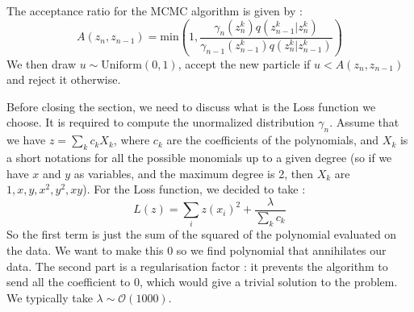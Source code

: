 \documentclass[11pt]{article}
\begin{document}
		
		The acceptance ratio for the MCMC algorithm is given by : 
		\begin{equation}
			A(z_n,z_{n-1}) = \mathrm{min} \left(1,\frac{ \gamma_n(z_n^k) q(z_{n-1}^k | z_n^k) }{ \gamma_{n-1}(z_{n-1}^k) q(z_n^k | z_{n-1}^k) }  \right)
		\end{equation}
		We then draw $u\sim \mathrm{Uniform}(0,1)$, accept the new particle if $u<A(z_n,z_{n-1})$ and reject it otherwise.
		
		Before closing the section, we need to discuss what is the Loss function we choose. It is required to compute the unormalized distribution $\gamma_n$. Assume that we have $z = \sum_k c_k X_k$, where $c_k$ are the coefficients of the polynomials, and $X_k$ is a short notations for all the possible monomials up to a given degree (so if we have $x$ and $y$ as variables, and the maximum degree is 2, then $X_k$ are $1, x, y, x^2, y^2, x y$). For the Loss function, we decided to take : 
		\begin{equation}
			L(z) = \sum_{i} z(x_i)^2 + \frac{\lambda}{\sum_k c_k}
		\end{equation}
		So the first term is just the sum of the squared of the polynomial evaluated on the data. We want to make this 0 so we find polynomial that annihilates our data. The second part is a regularisation factor : it prevents the algorithm to send all the coefficient to 0, which would give a trivial solution to the problem. We typically take $\lambda \sim \mathcal{O}(1000)$.
		
		
\end{document}
